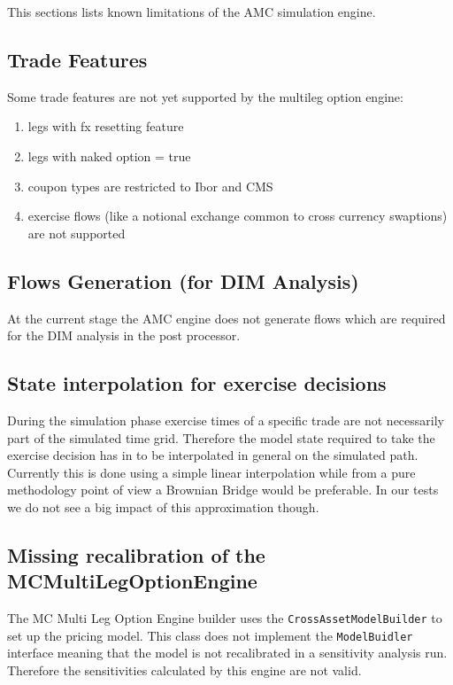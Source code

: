 \documentclass[12pt, a4paper]{article}
\begin{document}
This sections lists known limitations of the AMC simulation engine.

\subsection{Trade Features}\label{sec:limitations_trade_features}

Some trade features are not yet supported by the multileg option engine:

\begin{enumerate}
\item legs with fx resetting feature
\item legs with naked option = true
\item coupon types are restricted to Ibor and CMS
\item exercise flows (like a notional exchange common to cross currency swaptions) are not supported
\end{enumerate}

\subsection{Flows Generation (for DIM Analysis)}

At the current stage the AMC engine does not generate flows which are required for the DIM analysis in the post
processor.

\subsection{State interpolation for exercise decisions}

During the simulation phase exercise times of a specific trade are not necessarily part of the simulated time
grid. Therefore the model state required to take the exercise decision has in to be interpolated in general on the
simulated path. Currently this is done using a simple linear interpolation while from a pure methodology point of view a
Brownian Bridge would be preferable. In our tests we do not see a big impact of this approximation though.

\subsection{Missing recalibration of the MCMultiLegOptionEngine}\label{sec:limitations_recalibration}

The MC Multi Leg Option Engine builder uses the \verb+CrossAssetModelBuilder+ to set up the pricing model. This class
does not implement the \verb+ModelBuidler+ interface meaning that the model is not recalibrated in a sensitivity
analysis run. Therefore the sensitivities calculated by this engine are not valid.
\end{document}
